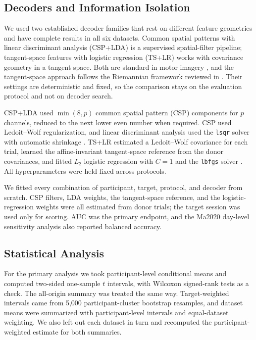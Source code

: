 \documentclass{ieeeaccess}
\begin{document}
\subsection{Decoders and Information Isolation}
We used two established decoder families that rest on different feature
geometries and have complete results in all six datasets. Common spatial
patterns with linear discriminant analysis (CSP+LDA) is a supervised
spatial-filter pipeline; tangent-space features with logistic regression
(TS+LR) works with covariance geometry in a tangent space. Both are standard in
motor imagery \cite{lotte2018review}, and the tangent-space approach follows
the Riemannian framework reviewed in
\cite{congedo2017riemannian,yger2017riemannian}. Their settings are
deterministic and fixed, so the comparison stays on the evaluation protocol and
not on decoder search.

CSP+LDA used $\min(8,p)$ common spatial pattern (CSP) components for $p$ channels,
reduced to the next lower even number when required. CSP used Ledoit--Wolf
regularization, and linear discriminant analysis used the \texttt{lsqr} solver
with automatic shrinkage \cite{blankertz2008csp}. TS+LR estimated a Ledoit--Wolf
covariance for each trial, learned the affine-invariant tangent-space reference
from the donor covariances, and fitted $L_2$ logistic regression with $C=1$ and
the \texttt{lbfgs} solver \cite{barachant2012riemann}. All hyperparameters were
held fixed across protocols.

We fitted every combination of participant, target, protocol, and decoder from
scratch. CSP filters, LDA weights, the tangent-space reference, and the
logistic-regression weights were all estimated from donor trials; the target
session was used only for scoring. AUC was the primary endpoint, and the
Ma2020 day-level sensitivity analysis also reported balanced accuracy.

\subsection{Statistical Analysis}
For the primary analysis we took participant-level conditional means and
computed two-sided one-sample $t$ intervals, with Wilcoxon signed-rank tests as
a check. The all-origin summary was treated the same way. Target-weighted
intervals came from 5,000 participant-cluster bootstrap resamples, and dataset
means were summarized with participant-level intervals and equal-dataset
weighting. We also left out each dataset in turn and recomputed the participant-weighted
estimate for both summaries.
\end{document}
